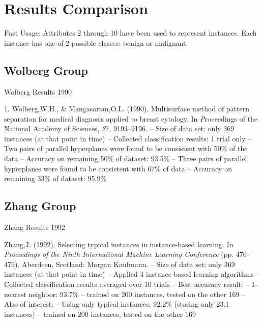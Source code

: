\documentclass[conference]{IEEEtran}
\begin{document}
\section{Results Comparison}

Past Usage: Attributes 2 through 10 have been used to represent instances. Each instance has one of 2 possible classes: benign or malignant.

\subsection*{Wolberg Group} 
\begin{table}[h!]
\center
	\caption{Wolberg Results 1990}
\label{table:Wol_Results} \cite{wolberg}

   1. Wolberg,W.H., \& Mangasarian,O.L. (1990). Multisurface method of 
      pattern separation for medical diagnosis applied to breast cytology. In
      {\textit Proceedings of the National Academy of Sciences}, {\textit 87},
      9193--9196.
      -- Size of data set: only 369 instances (at that point in time)
      -- Collected classification results: 1 trial only
      -- Two pairs of parallel hyperplanes were found to be consistent with
         50\% of the data
         -- Accuracy on remaining 50\% of dataset: 93.5\%
      -- Three pairs of parallel hyperplanes were found to be consistent with
         67\% of data
         -- Accuracy on remaining 33\% of dataset: 95.9\%
\end{table}



\subsection*{Zhang Group}
\begin{table}[h!]
\center
	\caption{Zhang Results 1992}
\label{table:Zhang_Results} \cite{zhang}

	Zhang,J. (1992). Selecting typical instances in instance-based
      learning.  In {\textit{ Proceedings of the Ninth International Machine
      Learning Conference}} (pp. 470--479).  Aberdeen, Scotland: Morgan
      Kaufmann.
      -- Size of data set: only 369 instances (at that point in time)
      -- Applied 4 instance-based learning algorithms 
      -- Collected classification results averaged over 10 trials
      -- Best accuracy result: 
         -- 1-nearest neighbor: 93.7\%
         -- trained on 200 instances, tested on the other 169
      -- Also of interest:
         -- Using only typical instances: 92.2\% (storing only 23.1 instances)
         -- trained on 200 instances, tested on the other 169
\end{table}
\end{document}
